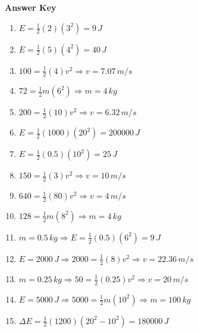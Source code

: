 \documentclass[12pt]{article}
\begin{document}
\newpage

\begin{center}
    \Large \textbf{Answer Key}
\end{center}

\vspace{0.5cm}

\begin{enumerate}

\item $E = \frac{1}{2}(2)(3^2) = 9 \, J$

\item $E = \frac{1}{2}(5)(4^2) = 40 \, J$

\item $100 = \frac{1}{2}(4)v^2 \Rightarrow v = 7.07 \, m/s$

\item $72 = \frac{1}{2}m(6^2) \Rightarrow m = 4 \, kg$

\item $200 = \frac{1}{2}(10)v^2 \Rightarrow v = 6.32 \, m/s$

\item $E = \frac{1}{2}(1000)(20^2) = 200000 \, J$

\item $E = \frac{1}{2}(0.5)(10^2) = 25 \, J$

\item $150 = \frac{1}{2}(3)v^2 \Rightarrow v = 10 \, m/s$

\item $640 = \frac{1}{2}(80)v^2 \Rightarrow v = 4 \, m/s$

\item $128 = \frac{1}{2}m(8^2) \Rightarrow m = 4 \, kg$

\item $m = 0.5 \, kg \Rightarrow E = \frac{1}{2}(0.5)(6^2) = 9 \, J$

\item $E = 2000 \, J \Rightarrow 2000 = \frac{1}{2}(8)v^2 \Rightarrow v = 22.36 \, m/s$

\item $m = 0.25 \, kg \Rightarrow 50 = \frac{1}{2}(0.25)v^2 \Rightarrow v = 20 \, m/s$

\item $E = 5000 \, J \Rightarrow 5000 = \frac{1}{2}m(10^2) \Rightarrow m = 100 \, kg$

\item $\Delta E = \frac{1}{2}(1200)(20^2 - 10^2) = 180000 \, J$

\end{enumerate}
\end{document}

